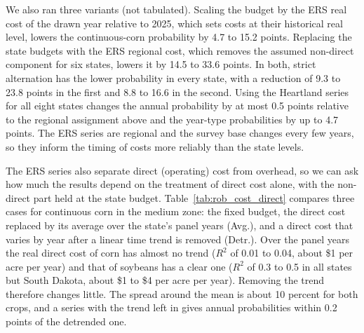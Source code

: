 \documentclass[11pt,letterpaper]{article}
\theoremstyle{remark}
\begin{document}
We also ran three variants (not tabulated). Scaling the budget by the ERS real cost of the drawn year relative to 2025, which sets costs at their historical real level, lowers the continuous-corn probability by 4.7 to 15.2 points. Replacing the state budgets with the ERS regional cost, which removes the assumed non-direct component for six states, lowers it by 14.5 to 33.6 points. In both, strict alternation has the lower probability in every state, with a reduction of 9.3 to 23.8 points in the first and 8.8 to 16.6 in the second. Using the Heartland series for all eight states changes the annual probability by at most 0.5 points relative to the regional assignment above and the year-type probabilities by up to 4.7 points. The ERS series are regional and the survey base changes every few years, so they inform the timing of costs more reliably than the state levels.

The ERS series also separate direct (operating) cost from overhead, so we can ask how much the results depend on the treatment of direct cost alone, with the non-direct part held at the state budget. Table~\ref{tab:rob_cost_direct} compares three cases for continuous corn in the medium zone: the fixed budget, the direct cost replaced by its average over the state's panel years (Avg.), and a direct cost that varies by year after a linear time trend is removed (Detr.). Over the panel years the real direct cost of corn has almost no trend (\(R^2\) of 0.01 to 0.04, about \$1 per acre per year) and that of soybeans has a clear one (\(R^2\) of 0.3 to 0.5 in all states but South Dakota, about \$1 to \$4 per acre per year). Removing the trend therefore changes little. The spread around the mean is about 10 percent for both crops, and a series with the trend left in gives annual probabilities within 0.2 points of the detrended one.

\begin{table}[H]
\centering
\caption{Annual breakeven probability (percent) under continuous corn, medium zone, with the direct cost fixed at the state budget (Fixed), replaced by the ERS regional average real direct cost (Avg.), or varying by year with the time trend removed (Detr.). Gap is strict alternation minus continuous corn, in points. Non-direct cost stays at the state budget.}
\label{tab:rob_cost_direct}
\footnotesize
\setlength{\tabcolsep}{3.5pt}

\end{table}
\end{document}
